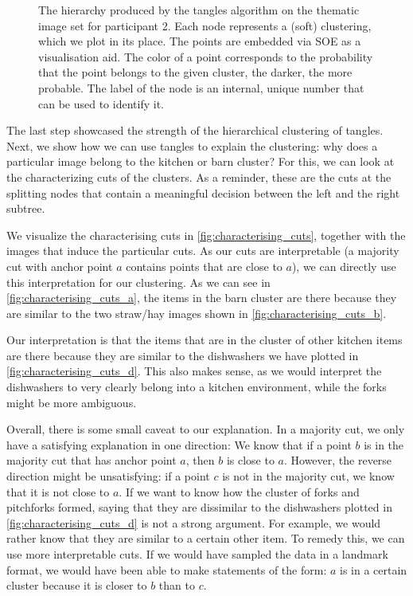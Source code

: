 \onecolumn
\begin{figure}[ht]
    \centering
    \caption{
        The hierarchy produced by the tangles algorithm on the thematic image set for participant 2. 
        Each node represents a (soft) clustering, which we plot in its place. The points are embedded via SOE as a visualisation aid.
        The color of a point corresponds to the probability that the point belongs to the given cluster, the darker, the more probable. 
        The label of the node is an internal, unique number that can be used to identify it.
    }
    \label{fig:soft-tree-vp2}
\end{figure}

The last step showcased the strength of the hierarchical clustering of tangles. Next, we show how we can use tangles to explain the clustering:
why does a particular image belong to the kitchen or barn cluster? For this, we can look at the characterizing cuts of the clusters. As a reminder, 
these are the cuts at the splitting nodes that contain a meaningful decision between the left and the right subtree.

We visualize the characterising cuts in \autoref{fig:characterising_cuts}, together with the images that induce the particular cuts. As our cuts are interpretable (a majority cut 
with anchor point $a$ contains points that are close to $a$), we can directly use this interpretation for our clustering. As we can see in \autoref{fig:characterising_cuts_a}, 
the items in the barn cluster are there because they are similar to the two straw/hay images shown in \autoref{fig:characterising_cuts_b}. 

Our interpretation is that the items that are in the cluster of other kitchen items are there because they are similar to
the dishwashers we have plotted in \autoref{fig:characterising_cuts_d}. This also makes sense, as we would interpret the dishwashers to very clearly belong into a kitchen environment, while the forks might be more ambiguous.

Overall, there is some small caveat to our explanation. In a majority cut, we only have a satisfying explanation in one direction: We know that if a point $b$ is in the majority cut that has anchor point $a$, 
then $b$ is close to $a$. However, the reverse direction might be unsatisfying: if a point $c$ is not in the majority cut, we know that it is not close to $a$. 
If we want to know how the cluster of forks and pitchforks formed, saying that they are dissimilar to the dishwashers plotted in \autoref{fig:characterising_cuts_d} is not a strong argument.
For example, we would rather know that they are similar to a certain other item.  To remedy this, we can use more interpretable cuts. 
If we would have sampled the data in a landmark format, we would have been able to make statements of the form: $a$ is in a certain cluster because it is closer to $b$ than to $c$.


